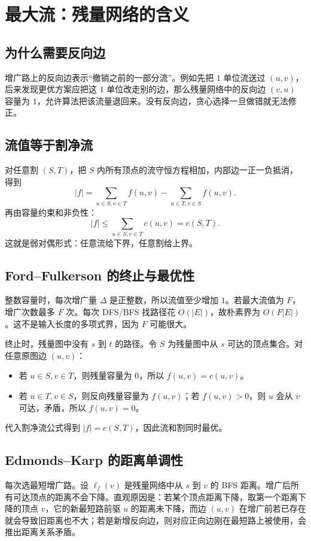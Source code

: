 \documentclass[UTF8,openany,12pt]{ctexbook}
\theoremstyle{remark}
\begin{document}
\section{最大流：残量网络的含义}
\subsection{为什么需要反向边}
增广路上的反向边表示“撤销之前的一部分流”。例如先把 $1$ 单位流送过 $(u,v)$，后来发现更优方案应把这 $1$ 单位改走别的边，那么残量网络中的反向边 $(v,u)$ 容量为 $1$，允许算法把该流量退回来。没有反向边，贪心选择一旦做错就无法修正。

\subsection{流值等于割净流}
对任意割 $(S,T)$，把 $S$ 内所有顶点的流守恒方程相加，内部边一正一负抵消，得到
\[
|f|=\sum_{u\in S,v\in T}f(u,v)-\sum_{u\in T,v\in S}f(u,v).
\]
再由容量约束和非负性：
\[
|f|\le \sum_{u\in S,v\in T}c(u,v)=c(S,T).
\]
这就是弱对偶形式：任意流给下界，任意割给上界。

\subsection{Ford--Fulkerson 的终止与最优性}
整数容量时，每次增广量 $\Delta$ 是正整数，所以流值至少增加 $1$。若最大流值为 $F$，增广次数最多 $F$ 次。每次 DFS/BFS 找路径花 $O(|E|)$，故朴素界为 $O(F|E|)$。这不是输入长度的多项式界，因为 $F$ 可能很大。

终止时，残量图中没有 $s$ 到 $t$ 的路径。令 $S$ 为残量图中从 $s$ 可达的顶点集合。对任意原图边 $(u,v)$：
\begin{itemize}
  \item 若 $u\in S,v\in T$，则残量容量为 $0$，所以 $f(u,v)=c(u,v)$。
  \item 若 $u\in T,v\in S$，则反向残量容量为 $f(u,v)$；若 $f(u,v)>0$，则 $u$ 会从 $v$ 可达，矛盾，所以 $f(u,v)=0$。
\end{itemize}
代入割净流公式得到 $|f|=c(S,T)$，因此流和割同时最优。

\subsection{Edmonds--Karp 的距离单调性}
每次选最短增广路。设 $\ell_f(v)$ 是残量网络中从 $s$ 到 $v$ 的 BFS 距离。增广后所有可达顶点的距离不会下降。直观原因是：若某个顶点距离下降，取第一个距离下降的顶点 $v$，它的新最短路前驱 $u$ 的距离未下降，而边 $(u,v)$ 在增广前若已存在就会导致旧距离也不大；若是新增反向边，则对应正向边刚在最短路上被使用，会推出距离关系矛盾。
\end{document}
